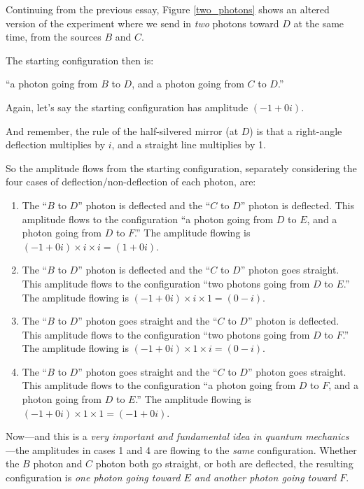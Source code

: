 
{
 Continuing from the previous essay, Figure \ref{two_photons} shows an altered
version of the experiment where we send in \textit{two} photons toward
$D$ at the same time, from the sources $B$ and $C$.}

{
 The starting configuration then is:}

{
 ``a photon going from $B$ to $D$,\newline
 and a photon going from $C$ to $D$.''}

{
 Again, let's say the starting configuration has
amplitude $(-1 + 0i)$.}

{
 And remember, the rule of the half-silvered mirror (at $D$) is that
a right-angle deflection multiplies by $i$, and a straight line
multiplies by 1.}

{
 So the amplitude flows from the starting configuration, separately
considering the four cases of deflection/non-deflection of each photon,
are:}

\begin{enumerate}
\item The ``$B$ to $D$'' photon is
deflected and the ``$C$ to $D$'' photon
is deflected. This amplitude flows to the configuration
``a photon going from $D$ to $E$, and a photon going from
$D$ to $F$.'' The amplitude flowing is $(-1 + 0i)
\times i \times i = (1 + 0i)$.

\item  The ``$B$ to $D$'' photon is
deflected and the ``$C$ to $D$'' photon
goes straight. This amplitude flows to the configuration
``two photons going from $D$ to $E$.''
The amplitude flowing is $(-1 + 0i) \times i \times 1 = (0 -
i)$.

\item The ``$B$ to $D$'' photon goes
straight and the ``$C$ to $D$'' photon
is deflected. This amplitude flows to the configuration
``two photons going from $D$ to $F$.''
The amplitude flowing is $(-1 + 0i) \times 1 \times i = (0 -
i)$.

\item  The ``$B$ to $D$'' photon goes
straight and the ``$C$ to $D$'' photon
goes straight. This amplitude flows to the configuration
``a photon going from $D$ to $F$, and a photon going from
$D$ to $E$.'' The amplitude flowing is $(-1 + 0i)
\times 1 \times 1 = (-1 + 0i)$.
\end{enumerate}

{
 Now---and this is a \textit{very important and fundamental idea in
quantum mechanics}{}---the amplitudes in cases 1 and 4 are flowing to
the \textit{same} configuration. Whether the $B$ photon and $C$ photon both
go straight, or both are deflected, the resulting configuration is
\textit{one photon going toward $E$ and another photon going toward $F$}.}

